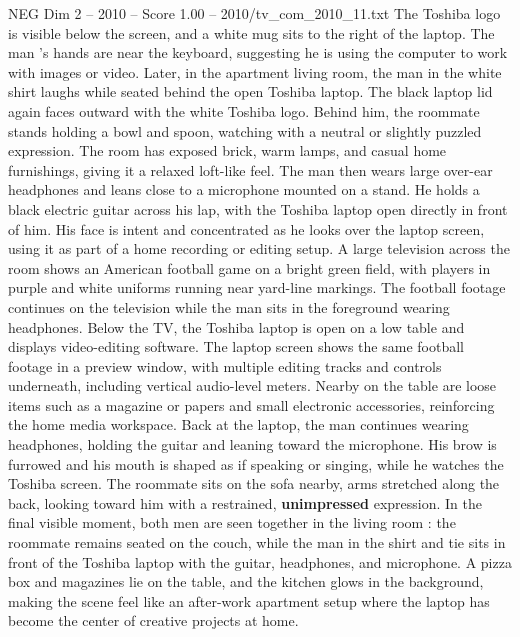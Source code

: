 \begin{textsample}{NEG Dim 2 – 2010 – Score 1.00 – 2010/tv\_com\_2010\_11.txt}
The Toshiba logo is visible below the screen, and a white mug sits to the right of the laptop.
The man ’s hands are near the keyboard, suggesting he is using the computer to work with images or video.
Later, in the apartment living room, the man in the white shirt laughs while seated behind the open Toshiba laptop.
The black laptop lid again faces outward with the white Toshiba logo.
Behind him, the roommate stands holding a bowl and spoon, watching with a neutral or slightly puzzled expression.
The room has exposed brick, warm lamps, and casual home furnishings, giving it a relaxed loft-like feel.
The man then wears large over-ear headphones and leans close to a microphone mounted on a stand.
He holds a black electric guitar across his lap, with the Toshiba laptop open directly in front of him.
His face is intent and concentrated as he looks over the laptop screen, using it as part of a home recording or editing setup.
A large television across the room shows an American football game on a bright green field, with players in purple and white uniforms running near yard-line markings.
The football footage continues on the television while the man sits in the foreground wearing headphones.
Below the TV, the Toshiba laptop is open on a low table and displays video-editing software.
The laptop screen shows the same football footage in a preview window, with multiple editing tracks and controls underneath, including vertical audio-level meters.
Nearby on the table are loose items such as a magazine or papers and small electronic accessories, reinforcing the home media workspace.
Back at the laptop, the man continues wearing headphones, holding the guitar and leaning toward the microphone.
His brow is furrowed and his mouth is shaped as if speaking or singing, while he watches the Toshiba screen.
The roommate sits on the sofa nearby, arms stretched along the back, looking toward him with a restrained, \textbf{unimpressed} expression.
In the final visible moment, both men are seen together in the living room : the roommate remains seated on the couch, while the man in the shirt and tie sits in front of the Toshiba laptop with the guitar, headphones, and microphone.
A pizza box and magazines lie on the table, and the kitchen glows in the background, making the scene feel like an after-work apartment setup where the laptop has become the center of creative projects at home.

\end{textsample}
